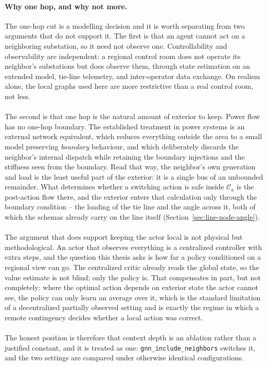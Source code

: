 {\color{clarif}
\paragraph{Why one hop, and why not more.}
The one-hop cut is a modelling decision and it is worth separating from two
arguments that do not support it. The first is that an agent cannot act on a
neighboring substation, so it need not observe one. Controllability and
observability are independent: a regional control room does not operate its
neighbor's substations but does observe them, through state estimation on an
extended model, tie-line telemetry, and inter-operator data exchange. On
realism alone, the local graphs used here are more restrictive than a real
control room, not less.
\\
\\
The second is that one hop is the natural amount of exterior to keep. Power flow
has no one-hop boundary. The established treatment in power systems is an
external network equivalent, which reduces everything outside the area to a
small model preserving \emph{boundary} behaviour, and which deliberately
discards the neighbor's internal dispatch while retaining the boundary
injections and the stiffness seen from the boundary. Read that way, the
neighbor's own generation and load is the least useful part of the exterior: it
is a single bus of an unbounded remainder. What determines whether a switching
action is safe inside $\mathcal{C}_a$ is the post-action flow there, and the
exterior enters that calculation only through the boundary condition -- the
loading of the tie line and the angle across it, both of which the schemas
already carry on the line itself
(Section~\ref{sec:line-node-angle}).
\\
\\
The argument that does support keeping the actor local is not physical but
methodological. An actor that observes everything is a centralized controller
with extra steps, and the question this thesis asks is how far a policy
conditioned on a regional view can go. The centralized critic already reads the
global state, so the value estimate is not blind; only the policy is. That
compensates in part, but not completely: where the optimal action depends on
exterior state the actor cannot see, the policy can only learn an average over
it, which is the standard limitation of a decentralized partially observed
setting and is exactly the regime in which a remote contingency decides whether
a local action was correct.
\\
\\
The honest position is therefore that context depth is an ablation rather than a
justified constant, and it is treated as one: \texttt{gnn\_include\_neighbors}
switches it, and the two settings are compared under otherwise identical
configurations.

}
